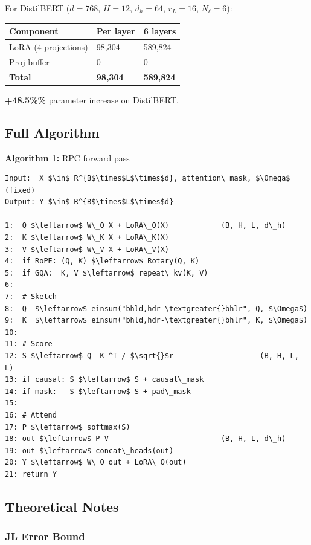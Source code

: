 For DistilBERT ($d = 768$, $H = 12$, $d_h = 64$, $r_L = 16$, $N_\ell = 6$):

\begin{table}[H]
\centering
\small
\begin{tabular}{lll}
\toprule
\textbf{Component} & \textbf{Per layer} & \textbf{6 layers} \\
\midrule
LoRA (4 projections) & 98,304 & 589,824 \\
Proj buffer & 0 & 0 \\
\textbf{Total} & \textbf{98,304} & \textbf{589,824} \\
\bottomrule
\end{tabular}
\end{table}

\textbf{+48.5\%\%} parameter increase on DistilBERT.

\subsection{Full Algorithm}

\textbf{Algorithm 1:} RPC forward pass
\begin{lstlisting}
Input:  X $\in$ R^{B$\times$L$\times$d}, attention\_mask, $\Omega$ (fixed)
Output: Y $\in$ R^{B$\times$L$\times$d}

1:  Q $\leftarrow$ W\_Q X + LoRA\_Q(X)            (B, H, L, d\_h)
2:  K $\leftarrow$ W\_K X + LoRA\_K(X)
3:  V $\leftarrow$ W\_V X + LoRA\_V(X)
4:  if RoPE: (Q, K) $\leftarrow$ Rotary(Q, K)
5:  if GQA:  K, V $\leftarrow$ repeat\_kv(K, V)
6:
7:  # Sketch
8:  Q  $\leftarrow$ einsum("bhld,hdr-\textgreater{}bhlr", Q, $\Omega$)
9:  K  $\leftarrow$ einsum("bhld,hdr-\textgreater{}bhlr", K, $\Omega$)
10:
11: # Score
12: S $\leftarrow$ Q  K ^T / $\sqrt{}$r                    (B, H, L, L)
13: if causal: S $\leftarrow$ S + causal\_mask
14: if mask:   S $\leftarrow$ S + pad\_mask
15:
16: # Attend
17: P $\leftarrow$ softmax(S)
18: out $\leftarrow$ P V                          (B, H, L, d\_h)
19: out $\leftarrow$ concat\_heads(out)
20: Y $\leftarrow$ W\_O out + LoRA\_O(out)
21: return Y
\end{lstlisting}

\subsection{Theoretical Notes}

\subsubsection{JL Error Bound}

